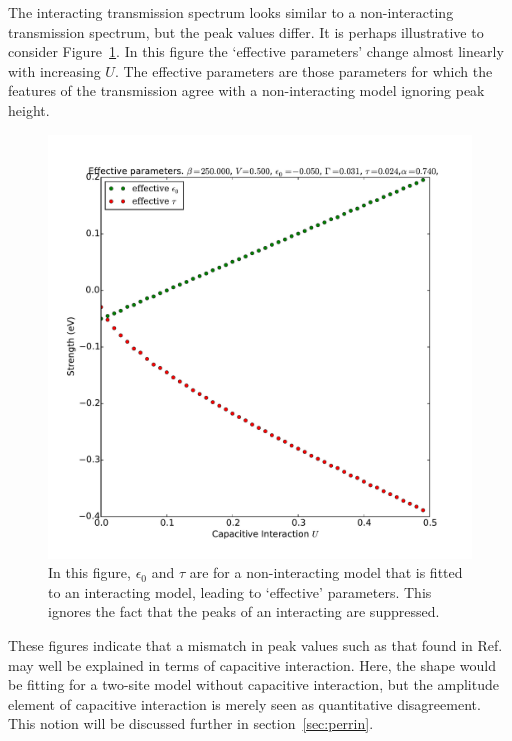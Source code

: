 The interacting transmission spectrum looks similar to a non-interacting transmission spectrum, but the peak values differ. It is perhaps illustrative to consider Figure~\ref{fig:perrin_effective}. In this figure the `effective parameters' change almost linearly with increasing $U$. The effective parameters are those parameters for which the features of the transmission agree with a non-interacting model ignoring peak height.
\begin{figure}[htb]
    \centering
    \includegraphics[height=.35\textheight]{pdf/trans/perrin_effective.pdf}
    \caption{In this figure, $\epsilon_0$ and $\tau$ are for a non-interacting model that is fitted to an interacting model, leading to `effective' parameters. This ignores the fact that the peaks of an interacting are suppressed. }
    \label{fig:perrin_effective}
\end{figure}


These figures indicate that a mismatch in peak values such as that found in Ref.~\cite{perrinnano} may well be explained in terms of capacitive interaction. Here, the shape would be fitting for a two-site model without capacitive interaction, but the amplitude element of capacitive interaction is merely seen as quantitative disagreement. This notion will be discussed further in section~\ref{sec:perrin}. 

